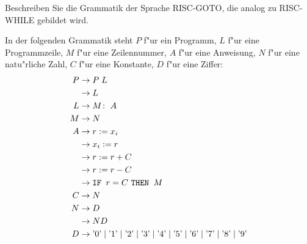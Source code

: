 Beschreiben Sie die Grammatik der Sprache RISC-GOTO, die analog zu
RISC-WHILE gebildet wird.

\begin{loesung}
In der folgenden Grammatik steht $P$ f"ur ein Programm, $L$ f"ur
eine Programmzeile, $M$ f"ur eine Zeilennummer, $A$ f"ur eine
Anweisung, $N$ f"ur eine natu"rliche Zahl, $C$ f"ur eine Konstante,
$D$ f"ur eine Ziffer:
\begin{align*}
P&\rightarrow P\; L\\
 &\rightarrow L\\
L&\rightarrow M\colon \; A\\
M&\rightarrow N\\
A&\rightarrow r := x_i\\
 &\rightarrow x_i := r\\
 &\rightarrow r := r + C\\
 &\rightarrow r := r - C\\
 &\rightarrow \text{\tt IF } r = C \text{ \tt THEN } M\\
C&\rightarrow N\\
N&\rightarrow D\\
 &\rightarrow ND\\
D&\rightarrow
\text{'0'}\;|\;
\text{'1'}\;|\;
\text{'2'}\;|\;
\text{'3'}\;|\;
\text{'4'}\;|\;
\text{'5'}\;|\;
\text{'6'}\;|\;
\text{'7'}\;|\;
\text{'8'}\;|\;
\text{'9'}
\end{align*}
\end{loesung}
